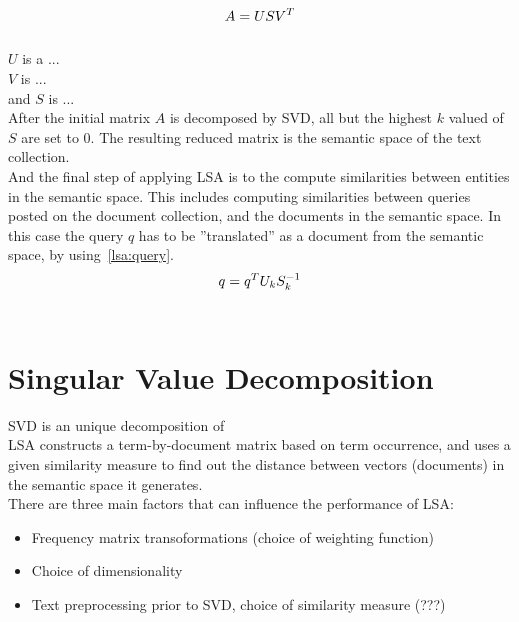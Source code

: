 %
%
\begin{equation}\label{lsa:svd}
A=USV^{T}\\
\end{equation}\\

$U$ is a ...\\
 $V$ is ...\\
and $S$ is ...\\
After the initial matrix $A$ is decomposed by \gls{SVD}, all but the highest $k$ valued of $S$ are set to $0$. The resulting reduced matrix is the semantic space of the text collection.\\

And the final step of applying \gls{LSA} is to the compute similarities between entities in the semantic space. This includes computing similarities between queries posted on the document collection, and the documents in the semantic space. In this case the query $q$ has to be ''translated'' as a document from the semantic space, by using~\ref{lsa:query}.\\

%
%
\begin{equation}\label{lsa:query}
q = q^{T}U_{k}S_{k}^{-1}\\
\end{equation}\\


\section{Singular Value Decomposition}

\gls{SVD} is an unique decomposition of \\


\gls{LSA} constructs a term-by-document matrix based on term occurrence, and uses a given similarity measure to find out the distance between vectors (documents) in the semantic space it generates.\\

There are three main factors that can influence the performance of LSA\cite{Nakov_weightfunctions}\cite{NakovBetterResultsLSI}:\\
\begin{itemize}
\item Frequency matrix transoformations (choice of weighting function)
\item Choice of dimensionality
\item Text preprocessing prior to SVD, choice of similarity measure (???)
\end{itemize}

